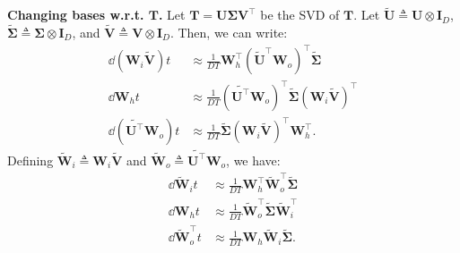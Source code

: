\documentclass{article}
\begin{document}
\textbf{Changing bases w.r.t. $\bm{T}$.}
Let $\bm{T} = \bm{U} \bm{\Sigma} \bm{V}^\top$ be the SVD of $\bm{T}$.
Let $\tilde{\bm{U}} \triangleq \bm{U} \otimes \bm{I}_D$, $\tilde{\bm{\Sigma}} \triangleq \bm{\Sigma} \otimes \bm{I}_D$, and $\tilde{\bm{V}} \triangleq \bm{V} \otimes \bm{I}_D$.
Then, we can write:
\begin{align*}
    \dd{(\bm{W}_i \tilde{\bm{V}})}{t} &\approx \frac{1}{DT} \bm{W}_{h}^\top (\tilde{\bm{U}}^\top \bm{W}_{o})^\top \tilde{\bm{\Sigma}} \\
    \dd{\bm{W}_h}{t} &\approx \frac{1}{DT} (\tilde{\bm{U}^\top} \bm{W}_{o})^\top \tilde{\bm{\Sigma}} (\bm{W}_{i} \tilde{\bm{V}})^\top \\
    \dd{(\tilde{\bm{U^\top}} \bm{W}_{o})}{t} &\approx \frac{1}{DT} \tilde{\bm{\Sigma}} (\bm{W}_{i} \tilde{\bm{V}})^\top \bm{W}_{h}^\top.
\end{align*}
Defining $\tilde{\bm{W}}_i \triangleq \bm{W}_i \tilde{\bm{V}}$ and $\tilde{\bm{W}}_o \triangleq \tilde{\bm{U}^\top} \bm{W}_{o}$, we have:
\begin{align*}
    \dd{\tilde{\bm{W}}_i}{t} &\approx \frac{1}{DT} \bm{W}_{h}^\top \tilde{\bm{W}}_o^\top \tilde{\bm{\Sigma}} \\
    \dd{\bm{W}_h}{t} &\approx \frac{1}{DT} \tilde{\bm{W}}_o^\top \tilde{\bm{\Sigma}} \tilde{\bm{W}}_i^\top \\
    \dd{\tilde{\bm{W}}_{o}^\top}{t} &\approx \frac{1}{DT} \bm{W}_{h} \tilde{\bm{W}}_i \tilde{\bm{\Sigma}}.
\end{align*}
\end{document}
